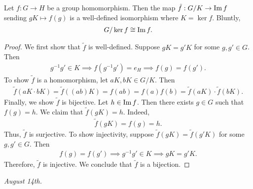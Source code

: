 \begin{theorem}
    Let $f:G \to H$ be a group homomorphism. Then the map $\tilde{f}:G/K \to \operatorname{Im} f$ sending $gK \mapsto f(g)$ is a well-defined isomorphism where $K = \ker f$. Bluntly,
    \begin{align}
        G/\ker f \cong \operatorname{Im} f.
    \end{align}
\end{theorem}
\begin{proof}
    We first show that $\tilde{f}$ is well-defined. Suppose $gK = g'K$ for some $g,g' \in G$. Then
    \begin{align}
        g^{-1}g' \in K \implies f(g^{-1}g') = e_{H} \implies f(g) = f(g').
    \end{align}
    To show $\tilde{f}$ is a homomorphism, let $aK,bK \in G/K$. Then
    \begin{align}
        \tilde{f}(aK \cdot bK) = \tilde{f}((ab)K) = f(ab) = f(a)f(b) = \tilde{f}(aK) \cdot \tilde{f}(bK).
    \end{align}
    Finally, we show $\tilde{f}$ is bijective. Let $h \in \operatorname{Im} f$. Then there exists $g \in G$ such that $f(g) = h$. We claim that $\tilde{f}(gK) = h$. Indeed,
    \begin{align}
        \tilde{f}(gK) = f(g) = h.
    \end{align}
    Thus, $\tilde{f}$ is surjective. To show injectivity, suppose $\tilde{f}(gK) = \tilde{f}(g'K)$ for some $g,g' \in G$. Then
    \begin{align}
        f(g) = f(g') \implies g^{-1}g' \in K \implies gK = g'K.
    \end{align}
    Therefore, $\tilde{f}$ is injective. We conclude that $\tilde{f}$ is a bijection.
\end{proof}

\textit{August 14th.}


